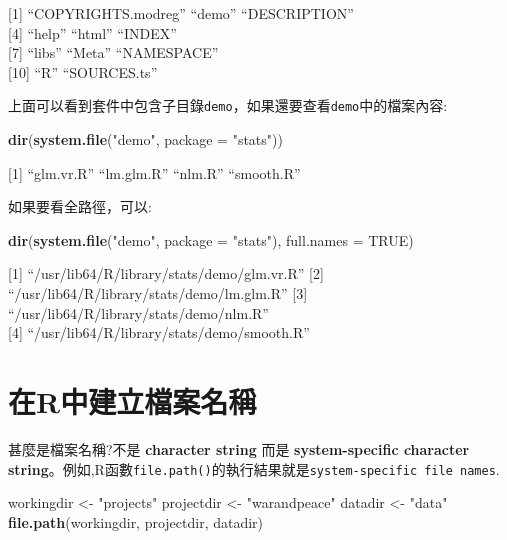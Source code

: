 \documentclass[]{book}
\newenvironment{Shaded}{\begin{snugshade}}{\end{snugshade}}
\newcommand{\KeywordTok}[1]{\textcolor[rgb]{0.13,0.29,0.53}{\textbf{#1}}}
\newcommand{\DataTypeTok}[1]{\textcolor[rgb]{0.13,0.29,0.53}{#1}}
\newcommand{\StringTok}[1]{\textcolor[rgb]{0.31,0.60,0.02}{#1}}
\newcommand{\OtherTok}[1]{\textcolor[rgb]{0.56,0.35,0.01}{#1}}
\newcommand{\NormalTok}[1]{#1}
\theoremstyle{definition}
\theoremstyle{definition}
\theoremstyle{definition}
\theoremstyle{remark}
\begin{document}
{[}1{]} ``COPYRIGHTS.modreg'' ``demo'' ``DESCRIPTION''\\
{[}4{]} ``help'' ``html'' ``INDEX''\\
{[}7{]} ``libs'' ``Meta'' ``NAMESPACE''\\
{[}10{]} ``R'' ``SOURCES.ts''

上面可以看到套件中包含子目錄\texttt{demo}，如果還要查看\texttt{demo}中的檔案內容:

\begin{Shaded}
\begin{Highlighting}[]
\KeywordTok{dir}\NormalTok{(}\KeywordTok{system.file}\NormalTok{(}\StringTok{"demo"}\NormalTok{, }\DataTypeTok{package =} \StringTok{"stats"}\NormalTok{))}
\end{Highlighting}
\end{Shaded}

{[}1{]} ``glm.vr.R'' ``lm.glm.R'' ``nlm.R'' ``smooth.R''

如果要看全路徑，可以:

\begin{Shaded}
\begin{Highlighting}[]
\KeywordTok{dir}\NormalTok{(}\KeywordTok{system.file}\NormalTok{(}\StringTok{"demo"}\NormalTok{, }\DataTypeTok{package =} \StringTok{"stats"}\NormalTok{), }\DataTypeTok{full.names =} \OtherTok{TRUE}\NormalTok{)}
\end{Highlighting}
\end{Shaded}

{[}1{]} ``/usr/lib64/R/library/stats/demo/glm.vr.R'' {[}2{]}
``/usr/lib64/R/library/stats/demo/lm.glm.R'' {[}3{]}
``/usr/lib64/R/library/stats/demo/nlm.R''\\
{[}4{]} ``/usr/lib64/R/library/stats/demo/smooth.R''

\section{在R中建立檔案名稱}\label{r}

甚麼是檔案名稱?不是 \textbf{character string} 而是
\textbf{system-specific character
string}。例如,R函數\texttt{file.path()}的執行結果就是\texttt{system-specific\ file\ names}.

\begin{Shaded}
\begin{Highlighting}[]
\NormalTok{workingdir <-}\StringTok{ "projects"}
\NormalTok{projectdir <-}\StringTok{ "warandpeace"}
\NormalTok{datadir    <-}\StringTok{ "data"}
\KeywordTok{file.path}\NormalTok{(workingdir, projectdir, datadir)}
\end{Highlighting}
\end{Shaded}
\end{document}
